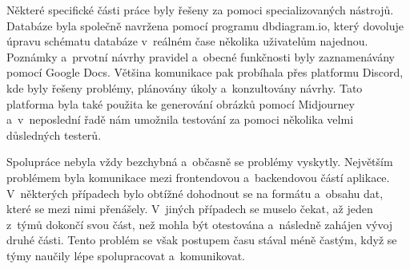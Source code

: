 Některé specifické části práce byly řešeny za pomoci specializovaných nástrojů. Databáze byla společně navržena pomocí programu dbdiagram.io, který dovoluje úpravu schématu databáze v~reálném čase několika uživatelům najednou. Poznámky a~prvotní návrhy pravidel a~obecné funkčnosti byly zaznamenávány pomocí Google Docs. Většina komunikace pak probíhala přes platformu Discord, kde byly řešeny problémy, plánovány úkoly a~konzultovány návrhy. Tato platforma byla také použita ke generování obrázků pomocí Midjourney a~v~neposlední řadě nám umožnila testování za pomoci několika velmi důsledných testerů.

Spolupráce nebyla vždy bezchybná a~občasně se problémy vyskytly. Největším problémem byla komunikace mezi frontendovou a~backendovou částí aplikace. V~některých případech bylo obtížné dohodnout se na formátu a~obsahu dat, které se mezi nimi přenášely. V~jiných případech se muselo čekat, až jeden z~týmů dokončí svou část, než mohla být otestována a~následně zahájen vývoj druhé části. Tento problém se však postupem času stával méně častým, když se týmy naučily lépe spolupracovat a~komunikovat.